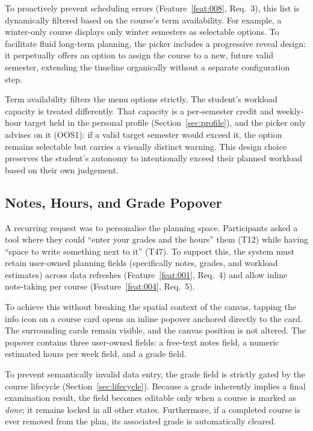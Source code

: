 To proactively prevent scheduling errors (Feature~\ref{feat:008}, Req.~3), this list is dynamically filtered based on the course's term availability. For example, a winter-only course displays only winter semesters as selectable options. To facilitate fluid long-term planning, the picker includes a progressive reveal design: it perpetually offers an option to assign the course to a new, future valid semester, extending the timeline organically without a separate configuration step.

Term availability filters the menu options strictly. The student's workload capacity is treated differently. That capacity is a per-semester credit and weekly-hour target held in the personal profile (Section~\ref{sec:profile}), and the picker only advises on it (OOS1): if a valid target semester would exceed it, the option remains selectable but carries a visually distinct warning. This design choice preserves the student's autonomy to intentionally exceed their planned workload based on their own judgement.
\subsection{Notes, Hours, and Grade Popover}
\label{sec:popover}

A recurring request was to personalise the planning space. Participants asked a tool where they could \enquote{enter your grades and the hours} them (T12) while having \enquote{space to write something next to it} (T47). To support this, the system must retain user-owned planning fields (specifically notes, grades, and workload estimates) across data refreshes (Feature~\ref{feat:001}, Req.~4) and allow inline note-taking per course (Feature~\ref{feat:004}, Req.~5).

To achieve this without breaking the spatial context of the canvas, tapping the info icon on a course card opens an inline popover anchored directly to the card. The surrounding cards remain visible, and the canvas position is not altered. The popover contains three user-owned fields: a free-text notes field, a numeric estimated hours per week field, and a grade field. 

To prevent semantically invalid data entry, the grade field is strictly gated by the course lifecycle (Section~\ref{sec:lifecycle}). Because a grade inherently implies a final examination result, the field becomes editable only when a course is marked as \emph{done}; it remains locked in all other states. Furthermore, if a completed course is ever removed from the plan, its associated grade is automatically cleared. 

